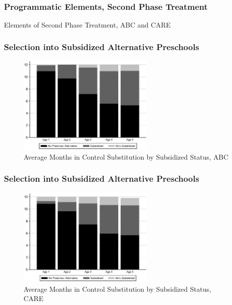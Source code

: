 \documentclass[static]{JJH-Beamer}
\begin{document}
\begin{frame}
\frametitle{Programmatic Elements, Second Phase Treatment}
	\begin{table}
		\caption{Elements of Second Phase Treatment, ABC and CARE}
	\scalebox{0.6}{}
	\end{table}
\hyperlink{programs}{}
\end{frame}


\begin{frame}
\frametitle{Selection into Subsidized Alternative Preschools}\label{abc_subsidized}
\begin{figure}
\caption{Average Months in Control Substitution by Subsidized Status, ABC}
	\includegraphics[width=18em]{output/blackwhite_CCnumber}
\end{figure}
\hyperlink{substitution}{}
\end{frame}


\begin{frame}
\frametitle{Selection into Subsidized Alternative Preschools}\label{care_subsidized}
\begin{figure}
\caption{Average Months in Control Substitution by Subsidized Status, CARE}
	\includegraphics[width=18em]{output/blackwhite_CCnumber_care}
\end{figure}
\hyperlink{substitution}{}
\end{frame}
\end{document}
